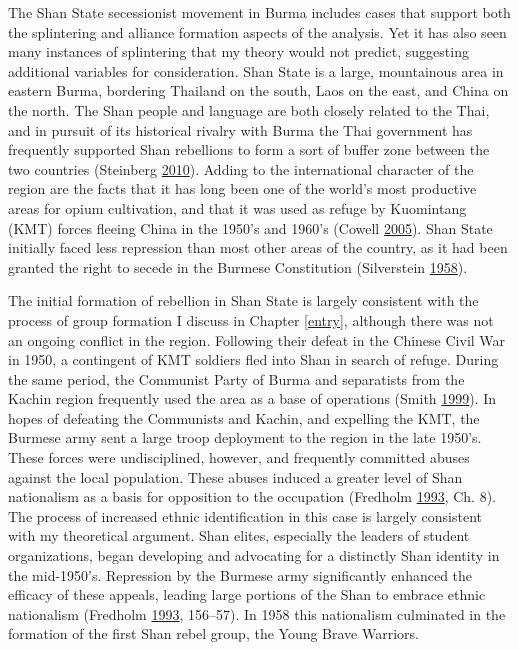 \documentclass[12pt,]{book}
\theoremstyle{definition}
\theoremstyle{definition}
\theoremstyle{remark}
\begin{document}
The Shan State secessionist movement in Burma includes cases that
support both the splintering and alliance formation aspects of the
analysis. Yet it has also seen many instances of splintering that my
theory would not predict, suggesting additional variables for
consideration. Shan State is a large, mountainous area in eastern Burma,
bordering Thailand on the south, Laos on the east, and China on the
north. The Shan people and language are both closely related to the
Thai, and in pursuit of its historical rivalry with Burma the Thai
government has frequently supported Shan rebellions to form a sort of
buffer zone between the two countries (Steinberg
\protect\hyperlink{ref-Steinberg2010}{2010}). Adding to the
international character of the region are the facts that it has long
been one of the world's most productive areas for opium cultivation, and
that it was used as refuge by Kuomintang (KMT) forces fleeing China in
the 1950's and 1960's (Cowell \protect\hyperlink{ref-Cowell2005}{2005}).
Shan State initially faced less repression than most other areas of the
country, as it had been granted the right to secede in the Burmese
Constitution (Silverstein
\protect\hyperlink{ref-Silverstein1958}{1958}).

The initial formation of rebellion in Shan State is largely consistent
with the process of group formation I discuss in Chapter \ref{entry},
although there was not an ongoing conflict in the region. Following
their defeat in the Chinese Civil War in 1950, a contingent of KMT
soldiers fled into Shan in search of refuge. During the same period, the
Communist Party of Burma and separatists from the Kachin region
frequently used the area as a base of operations (Smith
\protect\hyperlink{ref-Smith1999}{1999}). In hopes of defeating the
Communists and Kachin, and expelling the KMT, the Burmese army sent a
large troop deployment to the region in the late 1950's. These forces
were undisciplined, however, and frequently committed abuses against the
local population. These abuses induced a greater level of Shan
nationalism as a basis for opposition to the occupation (Fredholm
\protect\hyperlink{ref-Fredholm1993}{1993}, Ch. 8). The process of
increased ethnic identification in this case is largely consistent with
my theoretical argument. Shan elites, especially the leaders of student
organizations, began developing and advocating for a distinctly Shan
identity in the mid-1950's. Repression by the Burmese army significantly
enhanced the efficacy of these appeals, leading large portions of the
Shan to embrace ethnic nationalism (Fredholm
\protect\hyperlink{ref-Fredholm1993}{1993}, 156--57). In 1958 this
nationalism culminated in the formation of the first Shan rebel group,
the Young Brave Warriors.
\end{document}
